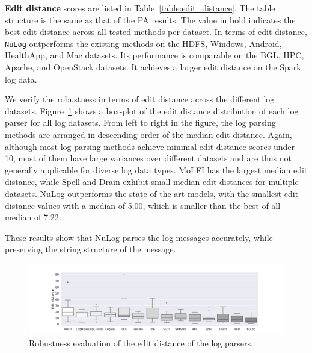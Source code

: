 \textbf{Edit distance} scores are listed in Table~\ref{table:edit_distance}. The table structure is the same as that of the PA results. The value in bold indicates the best edit distance across all tested methods per dataset. In terms of edit distance, \texttt{NuLog} outperforms the existing methods on the HDFS, Windows, Android, HealthApp, and Mac datasets. Its performance is comparable on the BGL, HPC, Apache, and OpenStack datasets. It achieves a larger edit distance on the Spark log data.

We verify the robustness in terms of edit distance across the different log datasets. Figure~\ref{robustness_ed} shows a box-plot of the edit distance distribution of each log parser for all log datasets. From left to right in the figure, the log parsing methods are arranged in descending order of the median edit distance. Again, although most log parsing methods achieve minimal edit distance scores under 10, most of them have large variances over different datasets and are thus not generally applicable for diverse log data types. MoLFI has the largest median edit distance, while Spell and Drain exhibit small median edit distances for multiple datasets. NuLog outperforms the state-of-the-art models, with the smallest edit distance values with a median of 5.00, which is smaller than the best-of-all median of 7.22.

These results show that NuLog parses the log messages accurately, while preserving the string structure of the message.


\begin{figure}[!htbp]
\centerline{\includegraphics[width=1.0\textwidth]{gfx/chap4/robustness_ed.pdf}}
\caption{Robustness evaluation of the edit distance of the log parsers.}
\label{robustness_ed}
\end{figure}

\newpage 

